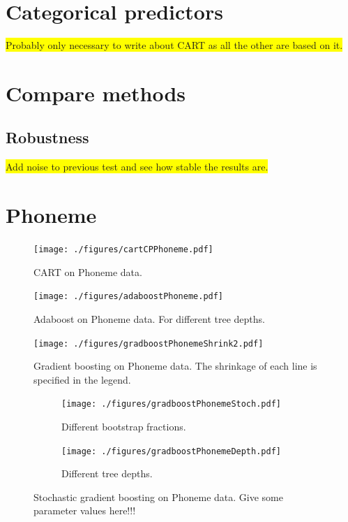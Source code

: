 \section{Categorical predictors}
\label{sec:Categorical predictors}
\colorbox{yellow}{Probably only necessary to write about CART as all the other are based on it.}

\section{Compare methods}
\label{sec:Compare methods}

\subsection{Robustness}
\label{sub:Robustness}

\colorbox{yellow}{Add noise to previous test and see how stable the results are.}
\section{Phoneme}
\label{sec:Phoneme}
\begin{figure}[h!]
\begin{center}
    \texttt{[image: ./figures/cartCPPhoneme.pdf]}
\end{center}
\caption{CART on Phoneme data.}
\label{fig:cartCPPhoneme}
\end{figure}


\begin{figure}[h!]
\begin{center}
    \texttt{[image: ./figures/adaboostPhoneme.pdf]}
\end{center}
\caption{Adaboost on Phoneme data. For different tree depths.}
\label{fig:adaboostPhoneme}
\end{figure}

\begin{figure}[h!]
\begin{center}
    \texttt{[image: ./figures/gradboostPhonemeShrink2.pdf]}
\end{center}
\caption{Gradient boosting on Phoneme data. The shrinkage of each line is specified in the legend.}
\label{fig:gradboostPhonemeShrink2}
\end{figure}

\begin{figure}[h!]
  \centering
  \begin{subfigure}[b]{0.48\textwidth}
    \texttt{[image: ./figures/gradboostPhonemeStoch.pdf]}
    \caption{Different bootstrap fractions.}
    \label{fig:gradboostPhonemeStoch}
  \end{subfigure}%
  \quad
  \begin{subfigure}[b]{0.48\textwidth}
    \texttt{[image: ./figures/gradboostPhonemeDepth.pdf]}
    \caption{Different tree depths.}
    \label{fig:gradboostPhonemeDepth}
  \end{subfigure}
  \vspace{1\baselineskip}
  \caption{Stochastic gradient boosting on Phoneme data. Give some parameter values here!!!}
  \label{fig:StochasticGradBoostPhoneme}
\end{figure}

